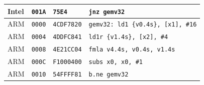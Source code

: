 \begin{table}[htbp]
\begin{tabular}{@{}l|l|l|p{7.2cm}@{}}
Intel & \texttt{001A} & \texttt{75E4} & \texttt{jnz gemv32} \\
\midrule
ARM & \texttt{0000} & \texttt{4CDF7820} & \texttt{gemv32: ld1 \{v0.4s\}, [x1], \#16} \\
ARM & \texttt{0004} & \texttt{4DDFC841} & \texttt{ld1r \{v1.4s\}, [x2], \#4} \\
ARM & \texttt{0008} & \texttt{4E21CC04} & \texttt{fmla v4.4s, v0.4s, v1.4s} \\
ARM & \texttt{000C} & \texttt{F1000400} & \texttt{subs x0, x0, \#1} \\
ARM & \texttt{0010} & \texttt{54FFFF81} & \texttt{b.ne gemv32} \\
\bottomrule
\end{tabular}
\endgroup
\end{table}
\noindent{}\par

